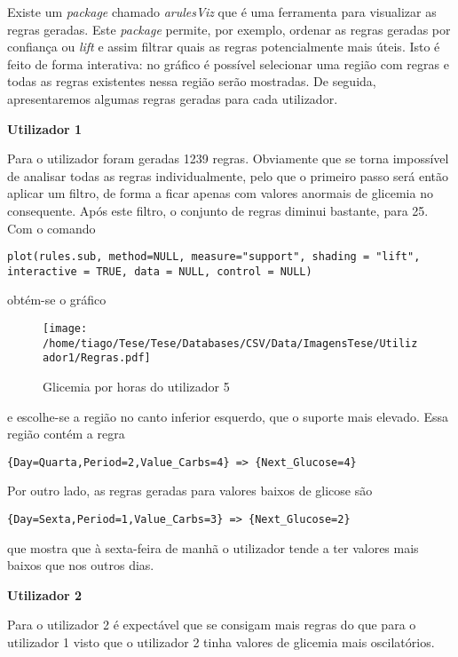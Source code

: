 Existe um \textit{package} chamado \textit{arulesViz} que é uma ferramenta para visualizar as regras geradas. Este \textit{package} permite, por exemplo, ordenar as regras geradas por confiança ou \textit{lift} e assim filtrar quais as regras potencialmente mais úteis. Isto é feito de forma interativa: no gráfico é possível selecionar uma região com regras e todas as regras existentes nessa região serão mostradas.
De seguida, apresentaremos algumas regras geradas para cada utilizador.

\textbf{Utilizador 1}

Para o utilizador foram geradas 1239 regras. Obviamente que se torna impossível de analisar todas as regras individualmente, pelo que o primeiro passo será então aplicar um filtro, de forma a ficar apenas com valores anormais de glicemia no consequente. Após este filtro, o conjunto de regras diminui bastante, para 25. Com o comando

\begin{lstlisting}
plot(rules.sub, method=NULL, measure="support", shading = "lift", interactive = TRUE, data = NULL, control = NULL)
\end{lstlisting}

obtém-se o gráfico

\begin{figure}[H]
\centering
\texttt{[image: /home/tiago/Tese/Tese/Databases/CSV/Data/ImagensTese/Utilizador1/Regras.pdf]}
\caption{Glicemia por horas do utilizador 5}
\end{figure}

e escolhe-se a região no canto inferior esquerdo, que o suporte mais elevado. Essa região contém a regra

\begin{lstlisting}
{Day=Quarta,Period=2,Value_Carbs=4} => {Next_Glucose=4}

\end{lstlisting}

Por outro lado, as regras geradas para valores baixos de glicose são

\begin{lstlisting}
{Day=Sexta,Period=1,Value_Carbs=3} => {Next_Glucose=2}
\end{lstlisting}

que mostra que à sexta-feira de manhã o utilizador tende a ter valores mais baixos que nos outros dias.


\textbf{Utilizador 2}

Para o utilizador 2 é expectável que se consigam mais regras do que para o utilizador 1 visto que o utilizador 2 tinha valores de glicemia mais oscilatórios. 


